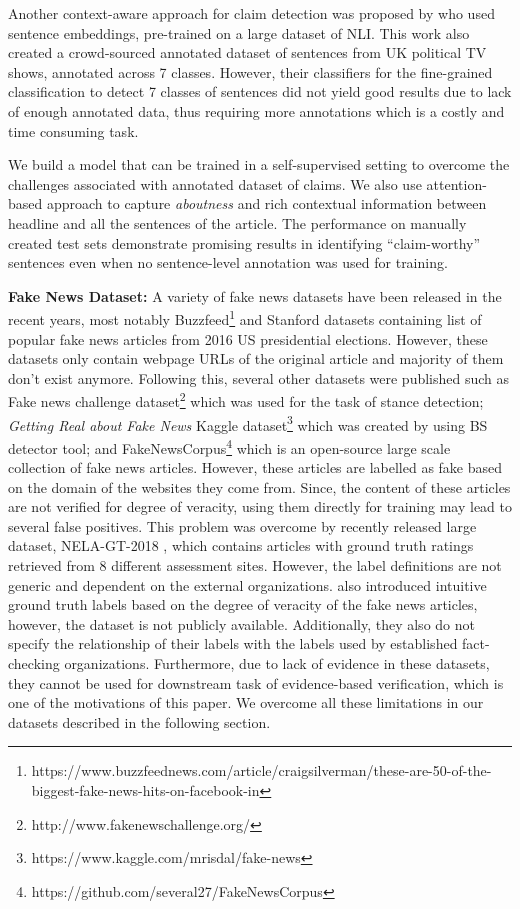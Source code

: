 \documentclass[11pt,a4paper]{article}
\begin{document}
{Another context-aware approach for claim detection was proposed by \citet{konstantinovskiy2018towards} who used sentence embeddings, pre-trained on a large dataset of NLI. This work also created a crowd-sourced annotated dataset of sentences from UK political TV shows, annotated across 7 classes. However, their classifiers for the fine-grained classification to detect 7 classes of sentences did not yield good results due to lack of enough annotated data, thus requiring more annotations which is a costly and time consuming task.
}

{
We build a model that can be trained in a self-supervised setting to overcome the challenges associated with annotated dataset of claims. We also use attention-based approach to capture \textit{aboutness} and rich contextual information between headline and all the sentences of the article. The performance on manually created test sets demonstrate promising results in identifying ``claim-worthy'' sentences even when no sentence-level annotation was used for training.
}

{\textbf{Fake News Dataset:} A variety of fake news datasets have been released in the recent years, most notably Buzzfeed\footnote{\label{note1}https://www.buzzfeednews.com/article/craigsilverman/these-are-50-of-the-biggest-fake-news-hits-on-facebook-in} and Stanford \cite{allcott2017social} datasets containing list of popular fake news articles from 2016 US presidential elections. However, these datasets only contain webpage URLs of the original article and majority of them don't exist anymore. Following this, several other datasets were published such as Fake news challenge dataset\footnote{http://www.fakenewschallenge.org/} which was used for the task of stance detection; \textit{Getting Real about Fake News} Kaggle dataset\footnote{https://www.kaggle.com/mrisdal/fake-news} which was created by using BS detector tool; and FakeNewsCorpus\footnote{\label{note2}https://github.com/several27/FakeNewsCorpus} which is an open-source large scale collection of fake news articles. However, these articles are labelled as fake based on the domain of the websites they come from. Since, the content of these articles are not verified for degree of veracity, using them directly for training may lead to several false positives.
}\newline
{
\indent This problem was overcome by recently released large dataset, NELA-GT-2018 \cite{nelagt2019}, which contains articles with ground truth ratings retrieved from 8 different assessment sites. However, the label definitions are not generic and dependent on the external organizations. \citet{pathak-srihari-2019-breaking} also introduced intuitive ground truth labels based on the degree of veracity of the fake news articles, however, the dataset is not publicly available. Additionally, they also do not specify the relationship of their labels with the labels used by established fact-checking organizations. Furthermore, due to lack of evidence in these datasets, they cannot be used for downstream task of evidence-based verification, which is one of the motivations of this paper. We overcome all these limitations in our datasets described in the following section. 
}
\end{document}
